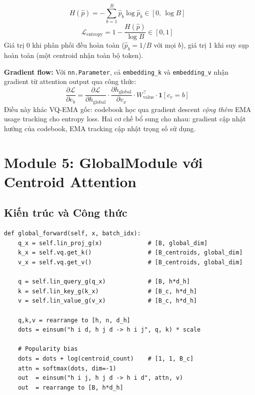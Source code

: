 \documentclass[12pt,a4paper]{article}
\begin{document}
\begin{mathbox}[title={Normalized Entropy Loss}]
\begin{equation}
  H(\hat{p}) = -\sum_{b=1}^B \hat{p}_b \log \hat{p}_b
  \in [0,\, \log B]
\end{equation}
\begin{equation}
  \mathcal{L}_\text{entropy} = 1 - \frac{H(\hat{p})}{\log B}
  \in [0, 1]
  \label{eq:entropy_loss}
\end{equation}
Giá trị 0 khi phân phối đều hoàn toàn ($\hat{p}_b = 1/B$ với mọi $b$),
giá trị 1 khi suy sụp hoàn toàn (một centroid nhận toàn bộ token).
\end{mathbox}

\begin{insightbox}
\textbf{Gradient flow:} Với \texttt{nn.Parameter}, cả \texttt{embedding\_k}
và \texttt{embedding\_v} nhận gradient từ attention output qua công thức:
\begin{equation}
  \frac{\partial \mathcal{L}}{\partial e_b} =
    \frac{\partial \mathcal{L}}{\partial h_\text{global}} \cdot
    \frac{\partial h_\text{global}}{\partial v_x} \cdot
    W_\text{value}^\top \cdot \mathbf{1}[c_v = b]
\end{equation}
Điều này khác VQ-EMA gốc: codebook học qua gradient descent
\emph{cộng thêm} EMA usage tracking cho entropy loss.
Hai cơ chế bổ sung cho nhau: gradient cập nhật hướng của codebook,
EMA tracking cập nhật trọng số sử dụng.
\end{insightbox}

\section{Module 5: GlobalModule với Centroid Attention}

\subsection{Kiến trúc và Công thức}

\begin{codebox}[title={model.py -- RelGTLayer.global\_forward() (rút gọn)}]
\begin{lstlisting}
def global_forward(self, x, batch_idx):
    q_x = self.lin_proj_g(x)             # [B, global_dim]
    k_x = self.vq.get_k()                # [B_centroids, global_dim]
    v_x = self.vq.get_v()                # [B_centroids, global_dim]
    
    q = self.lin_query_g(q_x)            # [B, h*d_h]
    k = self.lin_key_g(k_x)              # [B_c, h*d_h]
    v = self.lin_value_g(v_x)            # [B_c, h*d_h]
    
    q,k,v = rearrange to [h, n, d_h]
    dots = einsum("h i d, h j d -> h i j", q, k) * scale
    
    # Popularity bias
    dots = dots + log(centroid_count)    # [1, 1, B_c]
    attn = softmax(dots, dim=-1)
    out  = einsum("h i j, h j d -> h i d", attn, v)
    out  = rearrange to [B, h*d_h]
\end{lstlisting}
\end{codebox}
\end{document}
